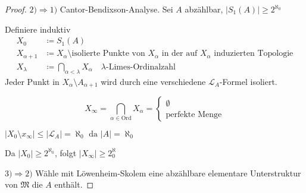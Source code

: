 \documentclass[12pt,parskip=full]{scrartcl}
\newcommand{\abs}[1]{{\left| #1 \right|}}
\newcommand{\heading}{\underline}
\theoremstyle{definition}
\begin{document}
	\begin{proof}
		\heading{$2) \Rightarrow 1)$} Cantor-Bendixson-Analyse. Sei $A$ abzählbar, $\abs{S_1(A)} \geq 2^{\aleph_0}$
		
		Definiere induktiv
		\begin{align*}
			X_0 &\coloneqq S_1(A) \\
			X_{\alpha + 1} &\coloneqq X_\alpha \setminus \text{isolierte Punkte von $X_\alpha$ in der auf $X_\alpha$ induzierten Topologie} \\
			X_\lambda &\coloneqq \bigcap_{\alpha < \lambda} X_\alpha \quad \text{$\lambda$-Limes-Ordinalzahl}
		\end{align*}
		Jeder Punkt in $X_\alpha \setminus A_{\alpha + 1}$ wird durch eine verschiedene $\mathcal{L}_A$-Formel isoliert.
		
		\begin{equation*}
			X_\infty = \bigcap_{\alpha \in \text{Ord}} X_\alpha = \begin{cases}
				\emptyset \\
				\text{perfekte Menge}
			\end{cases}
		\end{equation*}
		
		$\abs{X_0 \setminus x_\infty} \leq \abs{\mathcal{L}_A} = \aleph_0 \text{ da } \abs{A} = \aleph_0$
		
		Da $\abs{X_0} \geq 2^{\aleph_0}$, folgt $\abs{X_\infty} \geq 2^\aleph_0$
		
		\heading{$3) \Rightarrow 2)$} Wähle mit Löwenheim-Skolem eine abzählbare elementare Unterstruktur von $\mathfrak{M}$ die $A$ enthält.
 	\end{proof}
\end{document}
